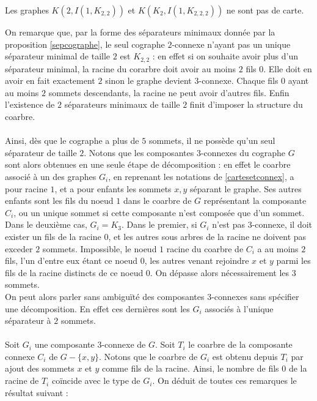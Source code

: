 \documentclass{scrartcl}
\begin{document}
\begin{flushleft}
\begin{lem}\label{2connstrictForbid}
    Les graphes $K(2, I(1, K_{2,2}))$ et $K(K_2, I(1, K_{2,2,2}))$ ne sont pas de carte.
\end{lem}

On remarque que, par la forme des séparateurs minimaux donnée par la proposition \ref{sepcographe}, le seul cographe $2$-connexe n'ayant
pas un unique séparateur minimal de taille $2$ est $K_{2,2}$ : en effet si on souhaite avoir plus d'un séparateur minimal,
la racine du corarbre doit avoir au moins $2$ fils $0$. Elle doit en avoir en fait exactement $2$ sinon le graphe devient $3$-connexe.
Chaque fils $0$ ayant au moins $2$ sommets descendants, la racine ne peut avoir d'autres fils. Enfin l'existence de $2$ séparateurs minimaux
de taille $2$ finit d'imposer la structure du coarbre.
\\~\\
Ainsi, dès que le cographe a plus de $5$ sommets, il ne possède qu'un seul séparateur de taille $2$. Notons que les composantes $3$-connexes
du cographe $G$ sont alors obtenues en une seule étape de décomposition : en effet le coarbre associé à un des graphes $G_i$, en reprenant
les notations de \ref{cartesetconnex}, a pour racine $1$, et a pour enfants les sommets $x,y$ séparant le graphe.
Ses autres enfants sont les fils du noeud $1$ dans le coarbre de $G$ représentant la composante $C_i$, ou un unique sommet si
cette composante n'est composée que d'un sommet. Dans le deuxième cas, $G_i = K_3$. Dans le premier, si $G_i$ n'est pas $3$-connexe,
il doit exister un fils de la racine $0$, et les autres sous arbres de la racine ne doivent pas exceder $2$ sommets. Impossible,
le noeud $1$ racine du coarbre de $C_i$ a au moins $2$ fils, l'un d'entre eux étant ce noeud $0$, les autres venant rejoindre $x$ et $y$
parmi les fils de la racine distincts de ce noeud $0$. On dépasse alors nécessairement les $3$ sommets.\\
On peut alors parler sans ambiguïté des composantes $3$-connexes sans spécifier une décomposition. En effet ces dernières sont
les $G_i$ associés à l'unique séparateur à $2$ sommets.
\\~\\
Soit $G_i$ une composante $3$-connexe de $G$. Soit $T_i$ le coarbre de la composante connexe $C_i$ de $G - \{x,y\}$.
Notons que le coarbre de $G_i$ est obtenu depuis $T_i$ par ajout des sommets $x$ et $y$ comme fils de la racine. Ainsi, le nombre de fils
$0$ de la racine de $T_i$ coïncide avec le type de $G_i$. On déduit de toutes ces remarques le résultat suivant :


\end{flushleft}
\end{document}
